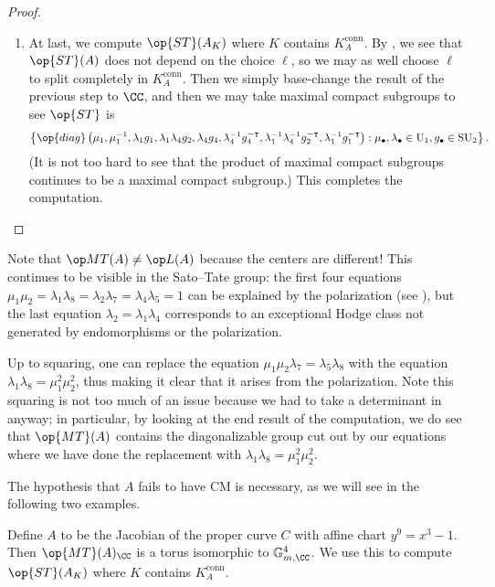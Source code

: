 \documentclass[../thesis.tex]{subfiles}
\begin{document}
\begin{proof}
\begin{enumerate}
		\item At last, we compute $\op{ST}(A_K)$ where $K$ contains $K_A^{\mathrm{conn}}$. By , we see that $\op{ST}(A)$ does not depend on the choice $\ell$, so we may as well choose $\ell$ to split completely in $K_A^{\mathrm{conn}}$. Then we simply base-change the result of the previous step to $\CC$, and then we may take maximal compact subgroups to see $\op{ST}$ is
		\[\left\{\op{diag}\left(\mu_1,\mu_1^{-1},\lambda_1g_1,\lambda_1\lambda_4g_2,\lambda_4g_4,\lambda_4^{-1}g_4^{-\intercal},\lambda_1^{-1}\lambda_4^{-1}g_2^{-\intercal},\lambda_1^{-1}g_1^{-\intercal}\right):\mu_\bullet,\lambda_\bullet\in\mathrm U_1,g_\bullet\in\mathrm{SU}_{2}\right\}.\]
		(It is not too hard to see that the product of maximal compact subgroups continues to be a maximal compact subgroup.) This completes the computation.
		\qedhere
	\end{enumerate}
\end{proof}
\begin{remark}
	Note that $\op MT(A)\ne\op L(A)$ because the centers are different! This continues to be visible in the Sato--Tate group: the first four equations $\mu_1\mu_2=\lambda_1\lambda_8=\lambda_2\lambda_7=\lambda_4\lambda_5=1$ can be explained by the polarization (see ), but the last equation $\lambda_2=\lambda_1\lambda_4$ corresponds to an exceptional Hodge class not generated by endomorphisms or the polarization.
\end{remark}
\begin{remark}
	Up to squaring, one can replace the equation $\mu_1\mu_2\lambda_7=\lambda_5\lambda_8$ with the equation $\lambda_1\lambda_8=\mu_1^2\mu_2^2$, thus making it clear that it arises from the polarization. Note this squaring is not too much of an issue because we had to take a determinant in  anyway; in particular, by looking at the end result of the computation, we do see that $\op{MT}(A)$ contains the diagonalizable group cut out by our equations where we have done the replacement with $\lambda_1\lambda_8=\mu_1^2\mu_2^2$.
\end{remark}
The hypothesis that $A$ fails to have CM is necessary, as we will see in the following two examples.
\begin{proposition} \label{prop:special-fermat-st-1}
	Define $A$ to be the Jacobian of the proper curve $C$ with affine chart $y^9=x^3-1$. Then $\op{MT}(A)_\CC$ is a torus isomorphic to $\mathbb G_{m,\CC}^4$. We use this to compute $\op{ST}(A_K)$ where $K$ contains $K_A^{\mathrm{conn}}$.
\end{proposition}
\end{document}
